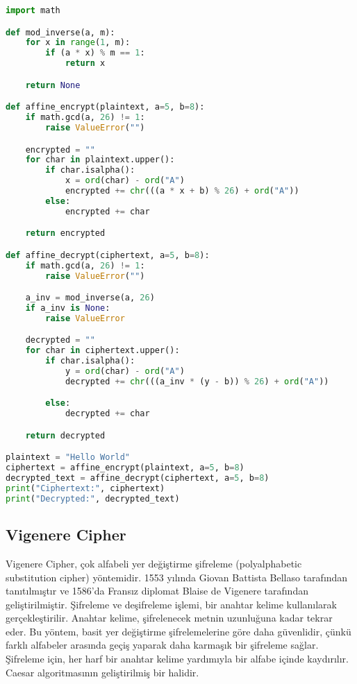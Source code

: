 \begin{lstlisting}[language=Python]
import math

def mod_inverse(a, m):
    for x in range(1, m):
        if (a * x) % m == 1:
            return x

    return None

def affine_encrypt(plaintext, a=5, b=8):
    if math.gcd(a, 26) != 1:
        raise ValueError("")

    encrypted = ""
    for char in plaintext.upper():
        if char.isalpha():
            x = ord(char) - ord("A")
            encrypted += chr(((a * x + b) % 26) + ord("A"))
        else:
            encrypted += char

    return encrypted

def affine_decrypt(ciphertext, a=5, b=8):
    if math.gcd(a, 26) != 1:
        raise ValueError("")

    a_inv = mod_inverse(a, 26)
    if a_inv is None:
        raise ValueError

    decrypted = ""
    for char in ciphertext.upper():
        if char.isalpha():
            y = ord(char) - ord("A")
            decrypted += chr(((a_inv * (y - b)) % 26) + ord("A"))

        else:
            decrypted += char

    return decrypted

plaintext = "Hello World"
ciphertext = affine_encrypt(plaintext, a=5, b=8)
decrypted_text = affine_decrypt(ciphertext, a=5, b=8)
print("Ciphertext:", ciphertext)
print("Decrypted:", decrypted_text)
\end{lstlisting}

\newpage

\subsection{Vigenere Cipher}

Vigenere Cipher, çok alfabeli yer değiştirme şifreleme (polyalphabetic substitution cipher) yöntemidir. 1553 yılında Giovan Battista Bellaso tarafından tanıtılmıştır ve 1586'da Fransız diplomat Blaise de Vigenere tarafından geliştirilmiştir. Şifreleme ve deşifreleme işlemi, bir anahtar kelime kullanılarak gerçekleştirilir. Anahtar kelime, şifrelenecek metnin uzunluğuna kadar tekrar eder. Bu yöntem, basit yer değiştirme şifrelemelerine göre daha güvenlidir, çünkü farklı alfabeler arasında geçiş yaparak daha karmaşık bir şifreleme sağlar. Şifreleme için, her harf bir anahtar kelime yardımıyla bir alfabe içinde kaydırılır. Caesar algoritmasının geliştirilmiş bir halidir.

